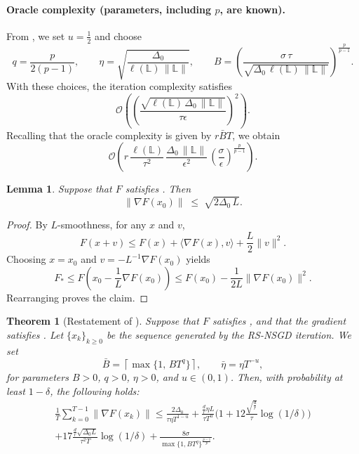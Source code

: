 \documentclass[10pt]{article}
\newtheorem{theorem}{Theorem}[section]
\newtheorem{lemma}[lemma]{Lemma}
\begin{document}
\paragraph{Oracle complexity (parameters, including $p$, are known).}
From , we set $u=\tfrac{1}{2}$ and choose
\[
q=\frac{p}{2(p-1)},\qquad
\eta=\sqrt{\frac{\Delta_0}{\ell(\mathbb{L})\,\|\mathbb{L}\|}},\qquad
B=\left(
\frac{\sigma\,\tau}{\sqrt{\Delta_0\,\ell(\mathbb{L})\,\|\mathbb{L}\|}}
\right)^{\frac{p}{p-1}}.
\]
With these choices, the iteration complexity satisfies 
\[
\mathcal{O}\!\left(\left(
\frac{\sqrt{\ell(\mathbb{L})\,\Delta_0\,\|\mathbb{L}\|}}{\tau\epsilon}
\right)^{2}\right).
\]
Recalling that the oracle complexity is given by $r\bar{B}T$,
we obtain
\[
\mathcal{O}\!\left(
r\,\frac{\ell(\mathbb{L})}{\tau^2}\,
\frac{\Delta_0\,\|\mathbb{L}\|}{\epsilon^{2}}\,
\left(\frac{\sigma}{\epsilon}\right)^{\frac{p}{p-1}}
\right).
\]


\begin{lemma}\label{lem:init-grad-bound}
Suppose that $F$ satisfies .
Then
\[
\|\nabla F(x_0)\|
\;\le\;
\sqrt{2 \Delta_0 \, L}.
\]
\end{lemma}

\begin{proof}
By $L$-smoothness, for any $x$ and $v$,
\[
F(x+v)
\le
F(x) + \langle \nabla F(x), v \rangle
+ \frac{L}{2} \|v\|^2 .
\]
Choosing $x=x_0$ and $v = - L^{-1} \nabla F(x_0)$ yields
\[
F_*
\le
F\!\left(x_0 - \frac{1}{L}\nabla F(x_0)\right)
\le
F(x_0) - \frac{1}{2L}\|\nabla F(x_0)\|^2 .
\]
Rearranging proves the claim.
\end{proof}





\begin{theorem}[Restatement of ]\label{app:high:minibatch-RNSGD-prob}
Suppose that $F$ satisfies , and that the gradient
satisfies .
Let $\{x_k\}_{k\ge 0}$ be the sequence generated by the RS-NSGD iteration.
We set
\[
\bar{B} = \left\lceil \max\{1,\, B T^q\} \right\rceil,
\qquad
\bar{\eta} = \eta T^{-u},
\]
for parameters $B > 0$, $q > 0$, $\eta > 0$, and $u \in (0,1)$.
Then, with probability at least $1 - \delta$, the following holds:
\begin{align*}
\frac{1}{T} \sum_{k=0}^{T-1} \|\nabla F(x_k)\|
\le \frac{2 \Delta_0}{\tau \eta T^{1-u}}
+ \frac{\frac{d}{r} \eta L}{\tau T^u} \big( 1 + 12\frac{\sqrt{\frac{d}{r}}}{\tau} \log (1/\delta) \big)
\\+ 17\frac{\frac{d}{r} \sqrt{\Delta_0 L}}{\tau^2 T} \log (1/\delta)
+ \frac{8 \sigma}{\max \{1, B T^q\}^{\frac{p-1}{p}}}.
\end{align*}
\end{theorem}
\end{document}
